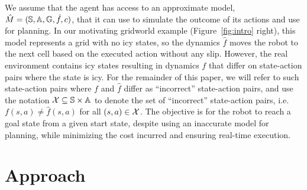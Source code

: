 We assume that the agent has access to an approximate model, $\hat{M} = (\mathbb{S},
\mathbb{A}, \mathbb{G}, \hat{f}, c)$, that it can use to simulate the outcome of
its actions and use for planning. In our motivating gridworld example
(Figure~\ref{fig:intro} right), this model
represents a grid with no icy states, so the dynamics $\hat{f}$
moves the robot to the next cell based on the executed
action without any slip. However, the real environment contains
icy states
resulting in dynamics $f$ that differ on state-action pairs where the
state is icy. For the remainder of this paper, we will
refer to such state-action pairs where $f$ and $\hat{f}$ differ as ``incorrect''
state-action pairs, and 
use the notation $\mathcal{X} \subseteq
\mathbb{S} \times \mathbb{A}$ to denote the set of ``incorrect'' state-action
pairs,
i.e. $f(s, a) \neq \hat{f}(s, a)$ for all $(s, a) \in
\mathcal{X}$.
The objective is for the robot to reach a goal
state from a given start state, despite using an inaccurate model for planning, while
minimizing the cost incurred and ensuring real-time execution.


\section{Approach}
\label{sec:approach-1}

